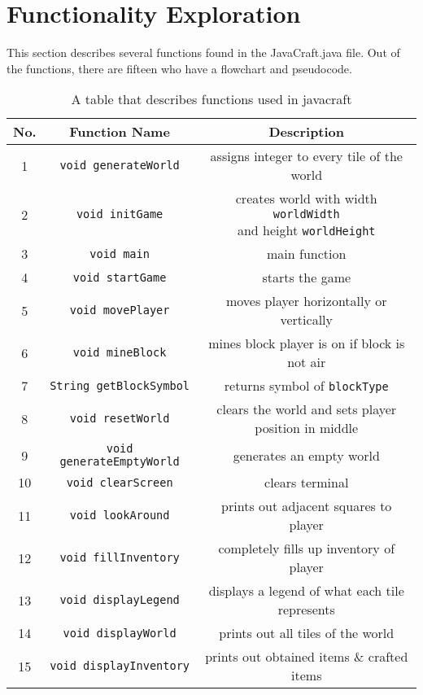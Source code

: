 \section{Functionality Exploration} \label{section: functionality exploration}

This section describes several functions found in the JavaCraft.java file. Out of the functions, there are fifteen who have a flowchart and pseudocode.

\begin{table}[ht]
    \centering
    \caption{A table that describes functions used in javacraft}
    \begin{tabular}{ccc}
    \toprule
    \textbf{No.}&\textbf{Function Name}&\textbf{Description}\\
    \midrule
    1& \texttt{void generateWorld} & assigns integer to every tile of the world\\
    2& \texttt{void initGame} & \makecell{creates world with width \texttt{worldWidth} \\and height \texttt{worldHeight}}\\
    3& \texttt{void main} & main function\\
    4& \texttt{void startGame} & starts the game\\
    5& \texttt{void movePlayer} & moves player horizontally or vertically\\
    6& \texttt{void mineBlock} & mines block player is on if block is not air\\
    7& \texttt{String getBlockSymbol} & returns symbol of \texttt{blockType}\\
    8& \texttt{void resetWorld} & clears the world and sets player position in middle\\
    9& \texttt{void generateEmptyWorld} & generates an empty world\\
    10& \texttt{void clearScreen} & clears terminal\\
    11& \texttt{void lookAround} & prints out adjacent squares to player\\
    12& \texttt{void fillInventory} & completely fills up inventory of player\\
    13& \texttt{void displayLegend} & displays a legend of what each tile represents\\
    14& \texttt{void displayWorld} & prints out all tiles of the world\\
    15& \texttt{void displayInventory} & prints out obtained items \& crafted items\\

\end{tabular}
\end{table}
